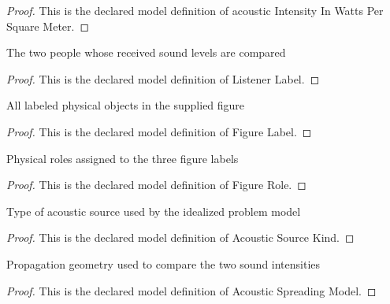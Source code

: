 \begin{proof}
  This is the declared model definition of acoustic Intensity In Watts Per Square Meter.
\end{proof}
\begin{definition}
  \label{def:physics:phyx-mini-0216:phyxminiproblems-problemphyxmini0216-listenerlabel}
  The two people whose received sound levels are compared
\end{definition}
\begin{proof}
  This is the declared model definition of Listener Label.
\end{proof}
\begin{definition}
  \label{def:physics:phyx-mini-0216:phyxminiproblems-problemphyxmini0216-figurelabel}
  All labeled physical objects in the supplied figure
\end{definition}
\begin{proof}
  This is the declared model definition of Figure Label.
\end{proof}
\begin{definition}
  \label{def:physics:phyx-mini-0216:phyxminiproblems-problemphyxmini0216-figurerole}
  Physical roles assigned to the three figure labels
\end{definition}
\begin{proof}
  This is the declared model definition of Figure Role.
\end{proof}
\begin{definition}
  \label{def:physics:phyx-mini-0216:phyxminiproblems-problemphyxmini0216-acousticsourcekind}
  Type of acoustic source used by the idealized problem model
\end{definition}
\begin{proof}
  This is the declared model definition of Acoustic Source Kind.
\end{proof}
\begin{definition}
  \label{def:physics:phyx-mini-0216:phyxminiproblems-problemphyxmini0216-acousticspreadingmodel}
  Propagation geometry used to compare the two sound intensities
\end{definition}
\begin{proof}
  This is the declared model definition of Acoustic Spreading Model.
\end{proof}
